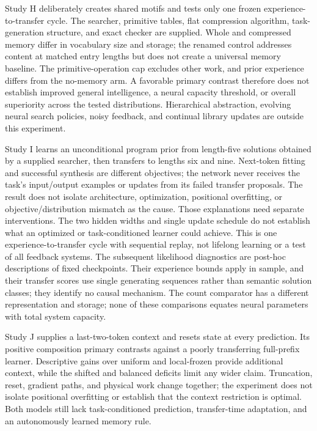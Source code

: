 \documentclass[11pt]{article}
\begin{document}
Study H deliberately creates shared motifs and tests only one frozen
experience-to-transfer cycle. The searcher, primitive tables, flat compression
algorithm, task-generation structure, and exact checker are supplied. Whole
and compressed memory differ in vocabulary size and storage; the renamed
control addresses content at matched entry lengths but does not create a
universal memory baseline. The primitive-operation cap excludes other work,
and prior experience differs from the no-memory arm. A favorable primary
contrast therefore does not establish improved general intelligence, a neural
capacity threshold, or overall superiority across the tested distributions.
Hierarchical abstraction, evolving neural search policies, noisy feedback,
and continual library updates are outside this experiment.

Study I learns an unconditional program prior from length-five solutions
obtained by a supplied searcher, then transfers to lengths six and nine.
Next-token fitting and successful synthesis are different objectives; the
network never receives the task's input/output examples or updates from its
failed transfer proposals. The result does not isolate architecture,
optimization, positional overfitting, or objective/distribution mismatch as
the cause. Those explanations need separate interventions. The two hidden
widths and single update schedule do not establish what an optimized or
task-conditioned learner could achieve. This is one experience-to-transfer
cycle with sequential replay, not lifelong learning or a test of all feedback
systems. The subsequent likelihood diagnostics are post-hoc descriptions of
fixed checkpoints. Their experience bounds apply in sample, and their transfer
scores use single generating sequences rather than semantic solution classes;
they identify no causal mechanism. The count comparator has a different representation and storage;
none of these comparisons equates neural parameters with total system capacity.

Study J supplies a last-two-token context and resets state at every prediction.
Its positive composition primary contrasts against a poorly transferring
full-prefix learner. Descriptive gains over uniform and local-frozen provide
additional context, while the shifted and balanced deficits limit any wider
claim. Truncation, reset, gradient paths, and physical work change together;
the experiment does not isolate positional overfitting or establish that the
context restriction is optimal. Both models still lack task-conditioned
prediction, transfer-time adaptation, and an autonomously learned memory rule.
\end{document}
